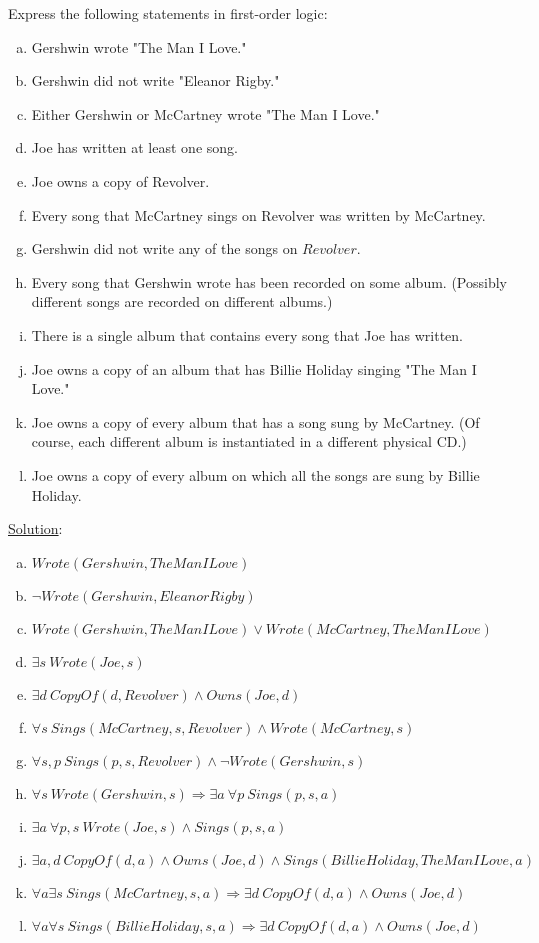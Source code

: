 \documentclass[11pt, answers]{exam}
\begin{document}
\begin{questions}
Express the following statements in first-order logic:
\begin{enumerate}[a.]
	\item Gershwin wrote "The Man I Love."
	\item Gershwin did not write "Eleanor Rigby."
	\item Either Gershwin or McCartney wrote "The Man I Love."
	\item Joe has written at least one song.
	\item Joe owns a copy of Revolver.
	\item Every song that McCartney sings on Revolver was written by McCartney.
	\item Gershwin did not write any of the songs on $Revolver$.
	\item Every song that Gershwin wrote has been recorded on some album. (Possibly different songs are recorded on different albums.)
	\item There is a single album that contains every song that Joe has written.
	\item Joe owns a copy of an album that has Billie Holiday singing "The Man I Love."
	\item Joe owns a copy of every album that has a song sung by McCartney. (Of course, each different album is instantiated in a different physical CD.)
	\item Joe owns a copy of every album on which all the songs are sung by Billie Holiday.
\end{enumerate}

\underline{Solution}:
\begin{enumerate}[a.]
	\item $Wrote(Gershwin, TheManILove)$
	\item $\neg Wrote(Gershwin, EleanorRigby)$
	\item $Wrote(Gershwin, TheManILove) \vee Wrote(McCartney, TheManILove)$
	\item $\exists s\ Wrote(Joe, s)$
	\item $\exists d\ CopyOf(d, Revolver) \wedge Owns(Joe, d)$
	\item $\forall s\ Sings(McCartney, s, Revolver) \wedge Wrote(McCartney, s)$
	\item $\forall s, p\ Sings(p, s, Revolver) \wedge \neg Wrote(Gershwin, s)$
	\item $\forall s\ Wrote(Gershwin, s) \Rightarrow \exists a\ \forall p\ Sings(p, s, a)$
	\item $\exists a\ \forall p,s\ Wrote(Joe, s) \wedge Sings(p, s, a)$ 
	\item $\exists a,d\ CopyOf(d, a)\wedge Owns(Joe, d)  \wedge Sings(BillieHoliday, TheManILove, a)$
	\item $\forall a \exists s\ Sings(McCartney, s, a) \Rightarrow \exists d\ CopyOf(d, a)\wedge Owns(Joe, d)  $
	\item $\forall a \forall s\ Sings(BillieHoliday, s, a) \Rightarrow \exists d\ CopyOf(d, a)\wedge Owns(Joe, d)  $
\end{enumerate}
\end{questions}
\end{document}
